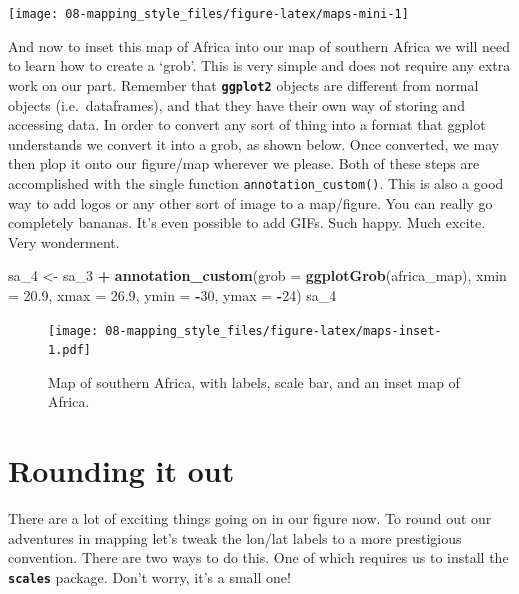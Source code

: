 \documentclass[]{book}
\newenvironment{Shaded}{\begin{snugshade}}{\end{snugshade}}
\newcommand{\KeywordTok}[1]{\textcolor[rgb]{0.13,0.29,0.53}{\textbf{#1}}}
\newcommand{\DataTypeTok}[1]{\textcolor[rgb]{0.13,0.29,0.53}{#1}}
\newcommand{\DecValTok}[1]{\textcolor[rgb]{0.00,0.00,0.81}{#1}}
\newcommand{\FloatTok}[1]{\textcolor[rgb]{0.00,0.00,0.81}{#1}}
\newcommand{\StringTok}[1]{\textcolor[rgb]{0.31,0.60,0.02}{#1}}
\newcommand{\OperatorTok}[1]{\textcolor[rgb]{0.81,0.36,0.00}{\textbf{#1}}}
\newcommand{\NormalTok}[1]{#1}
\theoremstyle{definition}
\theoremstyle{definition}
\theoremstyle{definition}
\theoremstyle{remark}
\begin{document}
\begin{center}\texttt{[image: 08-mapping\_style\_files/figure-latex/maps-mini-1]} \end{center}

And now to inset this map of Africa into our map of southern Africa we
will need to learn how to create a `grob'. This is very simple and does
not require any extra work on our part. Remember that
\textbf{\texttt{ggplot2}} objects are different from normal objects
(i.e.~dataframes), and that they have their own way of storing and
accessing data. In order to convert any sort of thing into a format that
ggplot understands we convert it into a grob, as shown below. Once
converted, we may then plop it onto our figure/map wherever we please.
Both of these steps are accomplished with the single function
\texttt{annotation\_custom()}. This is also a good way to add logos or
any other sort of image to a map/figure. You can really go completely
bananas. It's even possible to add GIFs. Such happy. Much excite. Very
wonderment.

\begin{Shaded}
\begin{Highlighting}[]
\NormalTok{sa_}\DecValTok{4}\NormalTok{ <-}\StringTok{ }\NormalTok{sa_}\DecValTok{3} \OperatorTok{+}
\StringTok{  }\KeywordTok{annotation_custom}\NormalTok{(}\DataTypeTok{grob =} \KeywordTok{ggplotGrob}\NormalTok{(africa_map),}
                    \DataTypeTok{xmin =} \FloatTok{20.9}\NormalTok{, }\DataTypeTok{xmax =} \FloatTok{26.9}\NormalTok{,}
                    \DataTypeTok{ymin =} \OperatorTok{-}\DecValTok{30}\NormalTok{, }\DataTypeTok{ymax =} \OperatorTok{-}\DecValTok{24}\NormalTok{)}
\NormalTok{sa_}\DecValTok{4}
\end{Highlighting}
\end{Shaded}

\begin{figure}
\centering
\texttt{[image: 08-mapping\_style\_files/figure-latex/maps-inset-1.pdf]}
\caption{\label{fig:maps-inset}Map of southern Africa, with labels, scale
bar, and an inset map of Africa.}
\end{figure}

\section{Rounding it out}\label{rounding-it-out}

There are a lot of exciting things going on in our figure now. To round
out our adventures in mapping let's tweak the lon/lat labels to a more
prestigious convention. There are two ways to do this. One of which
requires us to install the \textbf{\texttt{scales}} package. Don't
worry, it's a small one!
\end{document}
